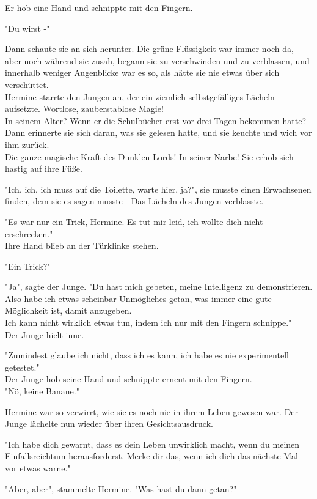 {Er hob eine Hand und schnippte mit den Fingern.

"Du wirst -"

Dann schaute sie an sich herunter. Die grüne Flüssigkeit war immer noch da, aber noch während sie zusah, begann sie zu verschwinden und zu verblassen, und innerhalb weniger Augenblicke war es so, als hätte sie nie etwas über sich verschüttet.\\ Hermine starrte den Jungen an, der ein ziemlich selbstgefälliges Lächeln aufsetzte. Wortlose, zauberstablose Magie!\\ In seinem Alter? Wenn er die Schulbücher erst vor drei Tagen bekommen hatte? Dann erinnerte sie sich daran, was sie gelesen hatte, und sie keuchte und wich vor ihm zurück.\\ Die ganze magische Kraft des Dunklen Lords! In seiner Narbe! Sie erhob sich hastig auf ihre Füße.

"Ich, ich, ich muss auf die Toilette, warte hier, ja?", sie musste einen Erwachsenen finden, dem sie es sagen musste - Das Lächeln des Jungen verblasste.

"Es war nur ein Trick, Hermine. Es tut mir leid, ich wollte dich nicht erschrecken."\\ Ihre Hand blieb an der Türklinke stehen.

"Ein Trick?"

"Ja", sagte der Junge. "Du hast mich gebeten, meine Intelligenz zu demonstrieren.\\ Also habe ich etwas scheinbar Unmögliches getan, was immer eine gute Möglichkeit ist, damit anzugeben.\\ Ich kann nicht wirklich etwas tun, indem ich nur mit den Fingern schnippe."\\ Der Junge hielt inne.

"Zumindest glaube ich nicht, dass ich es kann, ich habe es nie experimentell getestet."\\ Der Junge hob seine Hand und schnippte erneut mit den Fingern.\\ "Nö, keine Banane."

Hermine war so verwirrt, wie sie es noch nie in ihrem Leben gewesen war. Der Junge lächelte nun wieder über ihren Gesichtsausdruck.

"Ich habe dich gewarnt, dass es dein Leben unwirklich macht, wenn du meinen Einfallsreichtum herausforderst. Merke dir das, wenn ich dich das nächste Mal vor etwas warne."

"Aber, aber", stammelte Hermine. "Was hast du dann getan?"

}
